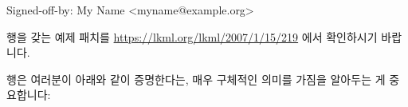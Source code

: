 \iffalse

PDFs of this book are sporadically posted at
\url{https://kernel.org/pub/linux/kernel/people/paulmck/perfbook/perfbook.html}
and at
\url{http://www.rdrop.com/users/paulmck/perfbook/}.

The actual process of contributing patches and sending \co{git pull}
requests is similar to that of the Linux kernel, which is documented
in the \path{Documentation/SubmittingPatches} file in the Linux source tree.
One important requirement is that each patch (or commit, in the case
of a \co{git pull} request) must contain a valid \co{Signed-off-by:} line,
which has the following format:

\fi

\begin{VerbatimU}
Signed-off-by: My Name <myname@example.org>
\end{VerbatimU}

 행을 갖는 예제 패치를
\url{https://lkml.org/lkml/2007/1/15/219} 에서 확인하시기 바랍니다.

 행은 여러분이 아래와 같이 증명한다는, 매우 구체적인 의미를
가짐을 알아두는 게 중요합니다:

\iffalse

Please see \url{https://lkml.org/lkml/2007/1/15/219} for an example
patch containing a \co{Signed-off-by:} line.

It is important to note that the \co{Signed-off-by:} line has
a very specific meaning, namely that you are certifying that:

\fi

